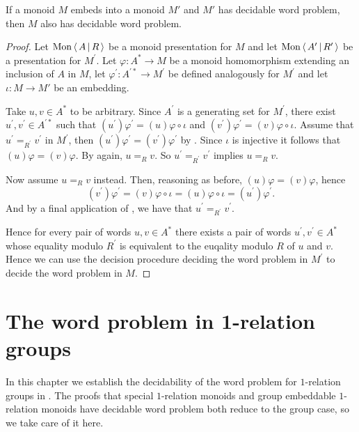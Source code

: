 \begin{lemma}\label{lem:embed_preimage_preserves_dec}
	If a monoid $M$ embeds into a monoid $M'$ and $M'$ has decidable word problem, then $M$ also has
	decidable word problem.
\end{lemma}
\begin{proof}
	Let $\mathrm{Mon}\left\langle\, A \,\middle|\, R \,\right\rangle$ be a monoid presentation for $M$ and let $\mathrm{Mon}\left\langle\, A^\prime \,\middle|\, R^\prime \,\right\rangle$ be a presentation
	for $M^\prime$. Let $\varphi: A^\ast\rightarrow M$ be a monoid homomorphism extending an inclusion of $A$ in
	$M$, let $\varphi^\prime: A^{\prime\ast} \rightarrow M^\prime$ be defined analogously for $M^\prime$ and let
	$\iota: M \rightarrow M'$ be an embedding.

	Take $u, v\in A^\ast$ to be arbitrary. Since $A^\prime$ is a generating set for $M^\prime$, there exist
	$u^\prime, v^\prime \in A^{\prime\ast}$ such that $(u^\prime)\varphi^\prime = (u)\varphi\circ \iota$ and
	$(v^\prime)\varphi^\prime = (v)\varphi\circ\iota$. Assume that $u^\prime =_{R^\prime} v^\prime$ in $M^\prime$, then
	$(u^\prime)\varphi^\prime = (v^\prime)\varphi^\prime$ by .
	Since $\iota$ is injective it follows that $(u)\varphi = (v)\varphi$. By 
	again, $u=_R v$. So $u^\prime =_{R^\prime} v^\prime$ implies $u=_R v$.

	Now assume $u=_R v$ instead. Then, reasoning as before, $(u)\varphi = (v)\varphi$, hence
	\[
		(v^\prime)\varphi^\prime = (v)\varphi\circ\iota =
		(u)\varphi\circ\iota = (u^\prime)\varphi^\prime.
	\]
	And by a final application of , we have that $u^\prime =_{R^\prime} v^\prime$.

	Hence for every pair of words $u, v\in A^\ast$ there exists a pair of words $u^\prime, v^\prime \in A^\ast$ whose
	equality modulo $R^\prime$ is equivalent to the euqality modulo $R$ of $u$ and $v$. Hence we can use the decision
	procedure deciding the word problem in $M^\prime$ to decide the word problem in $M$.
\end{proof}

\chapter{The word problem in 1-relation groups}\label{chap:1_relation_groups}

In this chapter we establish the decidability of the word problem for $1$-relation groups in
. The proofs that special $1$-relation monoids and group embeddable $1$-relation monoids
have decidable word problem both reduce to the group case, so we take care of it here.

